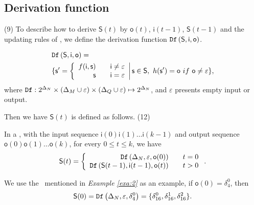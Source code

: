 \subsection{Derivation function}
{\color{red} (9)} To describe how to derive $\mathsf{S}(t)$ by $\mathsf{o}(t)$, $\mathsf{i}(t-1)$, $\mathsf{S}(t-1)$ and the updating rules of \BCN, we define the derivation function $\Ded\left( \mathsf{S},  \mathsf{i},  \mathsf{o}\right)$. %
\begin{definition}[$\Ded\left( \mathsf{S},  \mathsf{i},  \mathsf{o}\right)$] 
\begin{equation*}
\begin{split}
&\Ded\left( \mathsf{S},  \mathsf{i},  \mathsf{o}\right)=\\
&\{ \mathsf{s}'=\left\{
\begin{array}{rcl}
f( \mathsf{i}, \mathsf{s})      &      & {\mathsf{i}\neq \varepsilon}\\
\mathsf{s}       &      & {\mathsf{i}= \varepsilon}
\end{array} \right   |\mathsf{s} \in \mathsf{S}, \ h(\mathsf{s}')=\mathsf{o}\ if\ \mathsf{o}\neq \varepsilon\},
\end{split}
\end{equation*}
where ${\tt Df}:2^{\Delta_N}\times (\Delta_M\cup\varepsilon) \times (\Delta_Q\cup\varepsilon) \mapsto 2^{\Delta_N}$, and $\varepsilon$ presents empty input or output.
\end{definition}

 Then we have $\mathsf{S}(t)$ is defined as follows.{\color{red} (12)}
 \begin{definition}[$\mathsf{S}(t)$] In a \BCN, with the input sequence $\mathsf{i}(0)\mathsf{i}(1)\ldots\mathsf{i}(k-1)$ and output sequence $\mathsf{o}(0)\mathsf{o}(1)\ldots\mathsf{o}(k)$, for every $0\le t\le k$, we have
	\[\mathsf{S}(t)=\left\{
\begin{array}{rcl}
{\tt Df}\left(\Delta_N,\varepsilon,\mathsf{o}(0)\right)      &      & {t=0}\\
{\tt Df}\left(\mathsf{S}(t-1),\mathsf{i}(t-1),\mathsf{o}(t)\right)       &      & {t>0}
\end{array} \right. .\]

\end{definition}
\begin{example}
We use the \BCN\ mentioned in {\em Example \ref{exa:2}} as an example, if $\mathsf{o}(0)=\delta_4^0$, then \[\mathsf{S}(0)={\tt Df}\left(\Delta_N,\varepsilon,\delta_4^0\right)=\{\delta_{16}^0,\delta_{16}^1,\delta_{16}^2\}.\]
 \label{exa:8}
 \end{example}   
 

